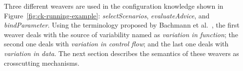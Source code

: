 Three different weavers are used in the configuration knowledge shown in
Figure~\ref{fig:ck-running-example}: \emph{selectScenarios},
\emph{evaluateAdvice}, and \emph{bindParameter}. Using the terminology
proposed by Bachmann et al.~\cite{Bachmann:2001aa}, the first weaver deals with
the source of variability named as \emph{variation in function}; the second one
deals with \emph{variation in control flow}; and the last one deals with
\emph{variation in data}. The next section describes the semantics of these
weavers as crosscutting mechanisms.




